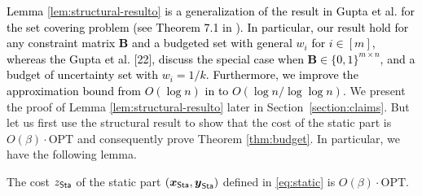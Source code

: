 \documentclass[moor]{informs1}              %
\newcommand{\opt}{\mathrm{OPT}}
\newcommand{\mb}[1]{\ensuremath{\boldsymbol{#1}}}
\newcommand*{\red}{\textcolor{black}}
\begin{document}
\red{Lemma \ref{lem:structural-resulto} is a generalization of the result in Gupta et al. \cite{gupta2014thresholded}  for the set covering problem (see Theorem 7.1 in \cite{gupta2014thresholded}).  In particular, our result hold for any constraint matrix $ \mb B$ and a budgeted set with general  $w_i$ for $i \in [m]$, whereas the Gupta et al. [22], discuss the special case  when $\mb B \in \{0,1\}^{m \times n}$,  and a budget of uncertainty set with $w_i = 1/k$. Furthermore, we improve the approximation bound from $O(\log n)$ in \cite{gupta2014thresholded} to $O(\log n/\log \log n)$.} We present the proof of Lemma \ref{lem:structural-resulto} later in Section~\ref{section:claims}. But let us first use the structural result to show that the cost of the static part is $O(\beta ) \cdot \opt$ and consequently prove Theorem \ref{thm:budget}.  In particular, we have the following lemma.

\begin{lemma} \label{lem:cost-static}
The cost $z_{\sf Sta} $ of the static part $(\mb x_{\sf Sta}, \mb y_{\sf Sta})$ defined  in \eqref{eq:static} is  $O (\beta) \cdot \opt$. 
\end{lemma}
\end{document}

